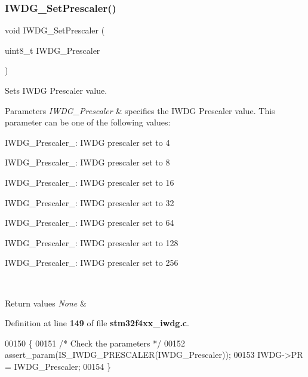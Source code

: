 \subsubsection{I\+W\+D\+G\+\_\+\+Set\+Prescaler()}
{\footnotesize\ttfamily void I\+W\+D\+G\+\_\+\+Set\+Prescaler (\begin{DoxyParamCaption}\item[{uint8\+\_\+t}]{I\+W\+D\+G\+\_\+\+Prescaler }\end{DoxyParamCaption})}



Sets I\+W\+DG Prescaler value. 


\begin{DoxyParams}{Parameters}
{\em I\+W\+D\+G\+\_\+\+Prescaler} & specifies the I\+W\+DG Prescaler value. This parameter can be one of the following values\+: \begin{DoxyItemize}
\item I\+W\+D\+G\+\_\+\+Prescaler\+\_\+: I\+W\+DG prescaler set to 4 \item I\+W\+D\+G\+\_\+\+Prescaler\+\_\+: I\+W\+DG prescaler set to 8 \item I\+W\+D\+G\+\_\+\+Prescaler\+\_\+: I\+W\+DG prescaler set to 16 \item I\+W\+D\+G\+\_\+\+Prescaler\+\_\+: I\+W\+DG prescaler set to 32 \item I\+W\+D\+G\+\_\+\+Prescaler\+\_\+: I\+W\+DG prescaler set to 64 \item I\+W\+D\+G\+\_\+\+Prescaler\+\_\+: I\+W\+DG prescaler set to 128 \item I\+W\+D\+G\+\_\+\+Prescaler\+\_\+: I\+W\+DG prescaler set to 256 \end{DoxyItemize}
\\
\hline
\end{DoxyParams}

\begin{DoxyRetVals}{Return values}
{\em None} & \\
\hline
\end{DoxyRetVals}


Definition at line \textbf{ 149} of file \textbf{ stm32f4xx\+\_\+iwdg.\+c}.


\begin{DoxyCode}
00150 \{
00151   \textcolor{comment}{/* Check the parameters */}
00152   assert_param(IS_IWDG_PRESCALER(IWDG\_Prescaler));
00153   IWDG->PR = IWDG\_Prescaler;
00154 \}
\end{DoxyCode}
\mbox{\label{group__IWDG__Group1_gae2a14752a0431f23cb80cebf202ac365}} 
